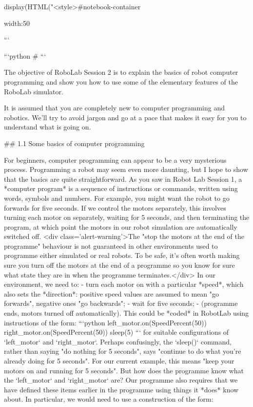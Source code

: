 \documentclass[letterpaper,10pt,english]{sphinxmanual}
\begin{document}
display(HTML("<style>#notebook-container { width:50%

```

```python
#%
```

The objective of RoboLab Session 2 is to explain the basics of robot computer programming and show you how to use some of the elementary features of the RoboLab simulator.

It is assumed that you are completely new to computer programming and robotics. We’ll try to avoid jargon and go at a pace that makes it easy for you to understand what is going on.


## 1.1 Some basics of computer programming

For beginners, computer programming can appear to be a very mysterious process. Programming a robot may seem even more daunting, but I hope to show that the basics are quite straightforward. As you saw in Robot Lab Session 1, a *computer program* is a sequence of instructions or commands, written using words, symbols and numbers.
For example, you might want the robot to go forwards for five seconds. If we control the motors separately, this involves turning each motor on separately, waiting for 5 seconds, and then terminating the program, at which point the motors in our robot simulation are automatically switched off.
<div class='alert-warning'>The "stop the motors at the end of the programme" behaviour is not guaranteed in other environments used to programme either simulated or real robots. To be safe, it's often worth making sure you turn off the motors at the end of a programme so you know for sure what state they are in when the programme terminates.</div>
In our environment, we need to:
- turn each motor on with a particular *speed*, which also sets the *direction*: positive speed values are assumed to mean "go forwards", negative ones "go backwards";
- wait for five seconds;
- (programme ends, motors turned off automatically).
This could be *coded* in RobotLab using instructions of the form:
```python
left_motor.on(SpeedPercent(50))
right_motor.on(SpeedPercent(50))
sleep(5)
```
for suitable configurations of `left_motor` and `right_motor`.
Perhaps confusingly, the `sleep()` command, rather than saying "do nothing for 5 seconds", says "continue to do what you're already doing for 5 seconds". For our current example, this means "keep your motors on and running for 5 seconds".
But how does the programme know what the `left_motor` and `right_motor` are? Our programme also requires that we have defined these items earlier in the programme using things it *does* know about. In particular, we would need to use a construction of the form:
}
\end{document}
